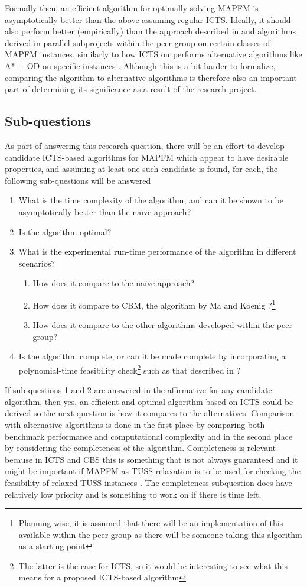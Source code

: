 \documentclass[a4paper,10pt,english]{article}
\begin{document}
	Formally then, an efficient algorithm for optimally solving MAPFM is asymptotically better than the above assuming regular ICTS. Ideally, it should also perform better (empirically) than the approach described in \cite{ma2016} and algorithms derived in parallel subprojects within the peer group on certain classes of MAPFM instances, similarly to how ICTS outperforms alternative algorithms like A* + OD on specific instances \cite{sharon2011}. Although this is a bit harder to formalize, comparing the algorithm to alternative algorithms is therefore also an important part of determining its significance as a result of the research project.
	\subsection*{Sub-questions}
	As part of answering this research question, there will be an effort to develop candidate ICTS-based algorithms for MAPFM which appear to have desirable properties, and assuming at least one such candidate is found, for each, the following sub-questions will be answered
	\begin{enumerate}
		\item What is the time complexity of the algorithm, and can it be shown to be asymptotically better than the naïve approach?
		\item Is the algorithm optimal?
		\item What is the experimental run-time performance of the algorithm in different scenarios?
		\begin{enumerate}
			\item How does it compare to the naïve approach?
			\item How does it compare to CBM, the algorithm by Ma and Koenig \cite{ma2016}?\footnote{Planning-wise, it is assumed that there will be an implementation of this available within the peer group as there will be someone taking this algorithm as a starting point} 
			\item How does it compare to the other algorithms developed within the peer group?
		\end{enumerate}
		\item Is the algorithm complete, or can it be made complete by incorporating a polynomial-time feasibility check\footnote{The latter is the case for ICTS, so it would be interesting to see what this means for a proposed ICTS-based algorithm} such as that described in \cite{yu2015}?
	\end{enumerate}
	If sub-questions 1 and 2 are answered in the affirmative for any candidate algorithm, then yes, an efficient and optimal algorithm based on ICTS could be derived so the next question is how it compares to the alternatives. Comparison with alternative algorithms is done in the first place by comparing both benchmark performance and computational complexity and in the second place by considering the completeness of the algorithm. Completeness is relevant because in ICTS and CBS this is something that is not always guaranteed \cite{sharon2015} and it might be important if MAPFM as TUSS relaxation is to be used for checking the feasibility of relaxed TUSS instances \cite{mulderij2020}. The completeness subquestion does have relatively low priority and is something to work on if there is time left.
\end{document}
